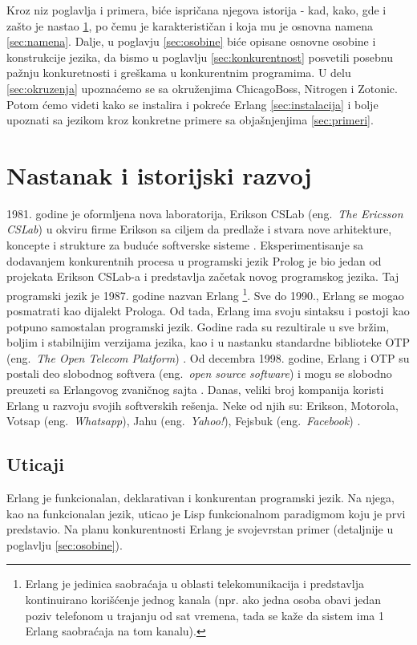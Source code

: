 \documentclass[a4paper]{article}
\begin{document}
{%
Kroz niz poglavlja i primera, biće ispričana njegova istorija - kad, kako, gde i zašto je nastao \ref{sec:nastanak}, 
po čemu je karakterističan i koja mu je osnovna namena \ref{sec:namena}. 
Dalje, u poglavju \ref{sec:osobine} biće opisane osnovne osobine i konstrukcije jezika, da bismo u poglavlju \ref{sec:konkurentnost} posvetili posebnu pažnju konkuretnosti i greškama u konkurentnim programima. 
U delu \ref{sec:okruzenja} upoznaćemo se sa okruženjima ChicagoBoss, Nitrogen i Zotonic. Potom ćemo videti kako se instalira i pokreće Erlang \ref{sec:instalacija}
i bolje upoznati sa jezikom kroz konkretne primere sa objašnjenjima \ref{sec:primeri}.


\section{Nastanak i istorijski razvoj}
\label{sec:nastanak}
1981. godine je oformljena nova laboratorija, Erikson CSLab (eng.~{\em The Ericsson CSLab}) u okviru firme Erikson sa
ciljem da predlaže i stvara nove arhitekture, koncepte i strukture za buduće softverske sisteme \cite{phdthesis}.
Eksperimentisanje sa dodavanjem konkurentnih procesa u programski jezik Prolog je bio jedan
od projekata Erikson CSLab-a i predstavlja začetak novog programskog jezika.
Taj programski jezik je 1987. godine nazvan Erlang
\footnote{ Erlang je jedinica saobraćaja u oblasti telekomunikacija 
i predstavlja kontinuirano korišćenje jednog kanala 
(npr. ako jedna osoba obavi jedan poziv telefonom u trajanju od sat vremena, 
tada se kaže da sistem ima 1 Erlang saobraćaja na tom kanalu).}.    
Sve do 1990., Erlang se mogao posmatrati kao dijalekt Prologa. Od tada, Erlang
ima svoju sintaksu i postoji kao potpuno samostalan programski jezik.
Godine rada su rezultirale u sve bržim, boljim i stabilnijim verzijama jezika, kao
i u nastanku standardne biblioteke OTP (eng.~{\em The Open Telecom Platform}) \cite{phdthesis}.
Od decembra 1998. godine, Erlang i OTP su postali deo slobodnog softvera (eng.~{\em open source software})
i mogu se slobodno preuzeti sa Erlangovog zvaničnog sajta \cite{sajt}.
Danas, veliki broj kompanija koristi Erlang u razvoju
svojih softverskih rešenja. Neke od njih su: Erikson, Motorola, Votsap (eng.~{\em Whatsapp}), 
Jahu (eng.~{\em Yahoo!}), Fejsbuk (eng.~{\em Facebook}) \cite{sajt}.


\subsection{Uticaji}
\label{subsec:uticaji}
Erlang je funkcionalan, deklarativan i konkurentan programski jezik.
Na njega, kao na funkcionalan jezik, uticao je Lisp funkcionalnom paradigmom koju je 
prvi predstavio. Na planu konkurentnosti Erlang je svojevrstan primer (detaljnije u poglavlju \ref{sec:osobine}). \\ 

}
\end{document}
